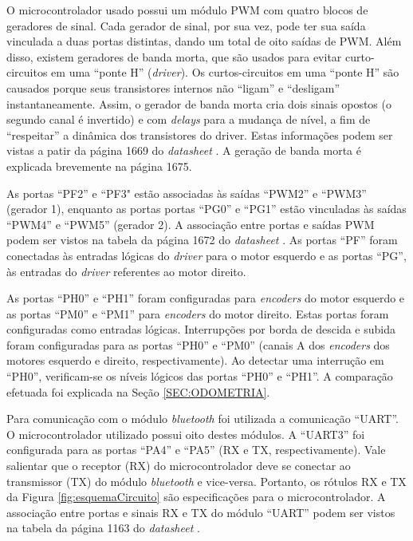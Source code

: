 	O microcontrolador usado possui um módulo PWM com quatro blocos de geradores de sinal. 
	Cada gerador de sinal, por sua vez, pode ter sua saída vinculada a duas portas distintas,
	dando um total de oito saídas de PWM. Além disso, existem geradores de banda morta, que 
	são usados para evitar curto-circuitos em uma ``ponte H'' (\textit{driver}). Os 
	curtos-circuitos em uma ``ponte H'' são causados porque seus transistores internos 
	não ``ligam'' e ``desligam'' instantaneamente. Assim, o gerador de banda morta cria 
	dois sinais opostos (o segundo canal é invertido) e com \textit{delays} para a mudança 
	de nível, a fim de ``respeitar'' a dinâmica dos transistores do driver. Estas informações 
	podem ser vistas a patir da página 1669 do \textit{datasheet} \cite{datasheet:TivaC}. A 
	geração de banda morta é explicada brevemente na página 1675.
	
	As portas ``PF2'' e ``PF3" estão associadas às saídas ``PWM2'' e ``PWM3'' (gerador
	1), enquanto as portas portas ``PG0'' e ``PG1'' estão vinculadas às saídas ``PWM4'' e 
	``PWM5'' (gerador 2). A associação entre portas e saídas PWM podem ser vistos na tabela 
	da página 1672 do \textit{datasheet} \cite{datasheet:TivaC}. As portas ``PF'' foram
	conectadas às entradas lógicas do \textit{driver} para o motor esquerdo e as portas 
	``PG'', às entradas do \textit{driver} referentes ao motor direito.

	As portas ``PH0'' e ``PH1'' foram configuradas para \textit{encoders} do motor esquerdo e
	as portas ``PM0'' e ``PM1'' para \textit{encoders} do motor direito. Estas portas foram 
	configuradas como entradas lógicas. Interrupções por borda de descida e subida foram
	configuradas para as portas ``PH0'' e ``PM0'' (canais A dos \textit{encoders} dos motores
	esquerdo e direito, respectivamente). Ao detectar uma interrução em ``PH0'', verificam-se 
	os níveis lógicos das portas ``PH0'' e ``PH1''. A comparação efetuada foi explicada na 
	Seção \ref{SEC:ODOMETRIA}.

	Para comunicação com o módulo \textit{bluetooth} foi utilizada a comunicação ``UART''. O
	microcontrolador utilizado possui oito destes módulos. A ``UART3'' foi configurada
	para as portas ``PA4'' e ``PA5'' (RX e TX, respectivamente). Vale salientar que o receptor
	(RX) do microcontrolador deve se conectar ao transmissor (TX) do módulo \textit{bluetooth} 
	e vice-versa. Portanto, os rótulos RX e TX da Figura \ref{fig:esquemaCircuito} são 
	especificações para o microcontrolador. A associação entre portas e sinais RX e TX do
	módulo ``UART'' podem ser vistos na tabela da página 1163 do \textit{datasheet} 
	\cite{datasheet:TivaC}. 
	
